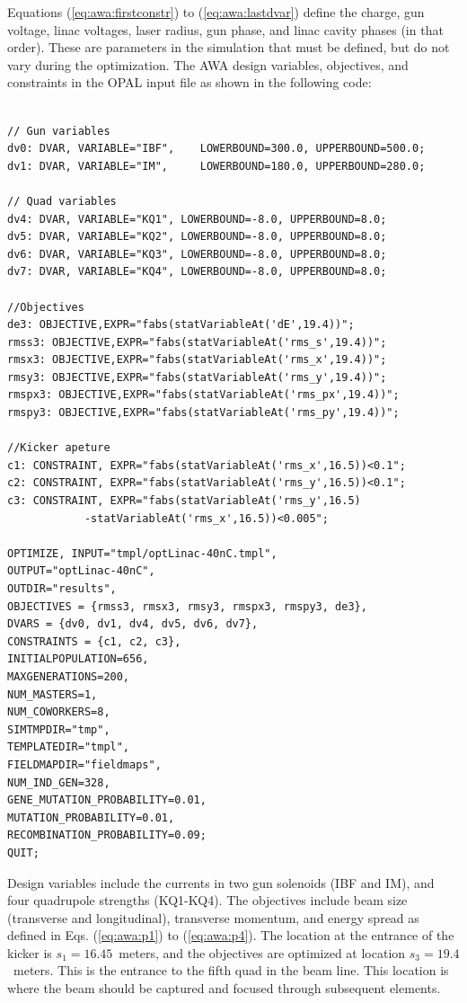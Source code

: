 Equations (\ref{eq:awa:firstconstr}) to
(\ref{eq:awa:lastdvar}) define the charge, gun voltage, linac voltages, 
laser radius, gun phase, and linac cavity phases (in that order). 
These are parameters in the simulation 
that must be defined, but do not vary during the optimization.
The AWA 
design variables, objectives, and constraints in the OPAL input file as shown in
the following code: %
\begin{Verbatim}[fontsize=\scriptsize]

// Gun variables 
dv0: DVAR, VARIABLE="IBF",    LOWERBOUND=300.0, UPPERBOUND=500.0;
dv1: DVAR, VARIABLE="IM",     LOWERBOUND=180.0, UPPERBOUND=280.0;

// Quad variables 
dv4: DVAR, VARIABLE="KQ1", LOWERBOUND=-8.0, UPPERBOUND=8.0;
dv5: DVAR, VARIABLE="KQ2", LOWERBOUND=-8.0, UPPERBOUND=8.0;
dv6: DVAR, VARIABLE="KQ3", LOWERBOUND=-8.0, UPPERBOUND=8.0;
dv7: DVAR, VARIABLE="KQ4", LOWERBOUND=-8.0, UPPERBOUND=8.0;

//Objectives
de3: OBJECTIVE,EXPR="fabs(statVariableAt('dE',19.4))";
rmss3: OBJECTIVE,EXPR="fabs(statVariableAt('rms_s',19.4))";
rmsx3: OBJECTIVE,EXPR="fabs(statVariableAt('rms_x',19.4))";
rmsy3: OBJECTIVE,EXPR="fabs(statVariableAt('rms_y',19.4))";
rmspx3: OBJECTIVE,EXPR="fabs(statVariableAt('rms_px',19.4))";
rmspy3: OBJECTIVE,EXPR="fabs(statVariableAt('rms_py',19.4))";

//Kicker apeture
c1: CONSTRAINT, EXPR="fabs(statVariableAt('rms_x',16.5))<0.1";
c2: CONSTRAINT, EXPR="fabs(statVariableAt('rms_y',16.5))<0.1";
c3: CONSTRAINT, EXPR="fabs(statVariableAt('rms_y',16.5)
			-statVariableAt('rms_x',16.5))<0.005";

OPTIMIZE, INPUT="tmpl/optLinac-40nC.tmpl",
OUTPUT="optLinac-40nC",
OUTDIR="results",
OBJECTIVES = {rmss3, rmsx3, rmsy3, rmspx3, rmspy3, de3},
DVARS = {dv0, dv1, dv4, dv5, dv6, dv7},
CONSTRAINTS = {c1, c2, c3},
INITIALPOPULATION=656,
MAXGENERATIONS=200,
NUM_MASTERS=1,
NUM_COWORKERS=8,
SIMTMPDIR="tmp",
TEMPLATEDIR="tmpl",
FIELDMAPDIR="fieldmaps",
NUM_IND_GEN=328,
GENE_MUTATION_PROBABILITY=0.01,
MUTATION_PROBABILITY=0.01,
RECOMBINATION_PROBABILITY=0.09;
QUIT;
\end{Verbatim}
\vspace{0.2cm}

Design variables include the currents in two gun solenoids (IBF and IM), 
and four quadrupole strengths (KQ1-KQ4). The objectives include
beam size (transverse and longitudinal), transverse momentum, and energy spread as
defined in Eqs. (\ref{eq:awa:p1}) to (\ref{eq:awa:p4}). 
The location at the entrance of the kicker is $s_1=16.45$~meters, 
and the objectives are optimized at location $s_3=19.4$~meters. 
This is the entrance to the fifth quad in the beam line. 
This location is where the beam should be captured and focused through subsequent elements.


